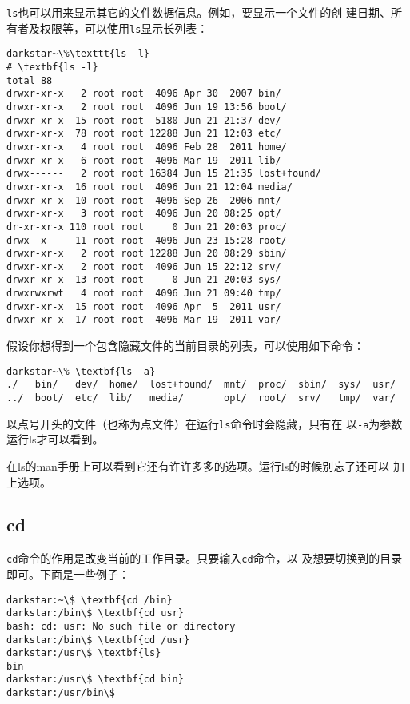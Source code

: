 \texttt{ls}也可以用来显示其它的文件数据信息。例如，要显示一个文件的创
建日期、所有者及权限等，可以使用\texttt{ls}显示长列表：
\begin{Verbatim}[frame=single,commandchars=\\\{\}]
darkstar~\%\texttt{ls -l}
# \textbf{ls -l}
total 88
drwxr-xr-x   2 root root  4096 Apr 30  2007 bin/
drwxr-xr-x   2 root root  4096 Jun 19 13:56 boot/
drwxr-xr-x  15 root root  5180 Jun 21 21:37 dev/
drwxr-xr-x  78 root root 12288 Jun 21 12:03 etc/
drwxr-xr-x   4 root root  4096 Feb 28  2011 home/
drwxr-xr-x   6 root root  4096 Mar 19  2011 lib/
drwx------   2 root root 16384 Jun 15 21:35 lost+found/
drwxr-xr-x  16 root root  4096 Jun 21 12:04 media/
drwxr-xr-x  10 root root  4096 Sep 26  2006 mnt/
drwxr-xr-x   3 root root  4096 Jun 20 08:25 opt/
dr-xr-xr-x 110 root root     0 Jun 21 20:03 proc/
drwx--x---  11 root root  4096 Jun 23 15:28 root/
drwxr-xr-x   2 root root 12288 Jun 20 08:29 sbin/
drwxr-xr-x   2 root root  4096 Jun 15 22:12 srv/
drwxr-xr-x  13 root root     0 Jun 21 20:03 sys/
drwxrwxrwt   4 root root  4096 Jun 21 09:40 tmp/
drwxr-xr-x  15 root root  4096 Apr  5  2011 usr/
drwxr-xr-x  17 root root  4096 Mar 19  2011 var/
\end{Verbatim}

假设你想得到一个包含隐藏文件的当前目录的列表，可以使用如下命令：
\begin{Verbatim}[frame=single,commandchars=\\\{\}]
darkstar~\% \textbf{ls -a}
./   bin/   dev/  home/  lost+found/  mnt/  proc/  sbin/  sys/  usr/
../  boot/  etc/  lib/   media/       opt/  root/  srv/   tmp/  var/
\end{Verbatim}
以点号开头的文件（也称为点文件）在运行\texttt{ls}命令时会隐藏，只有在
以\texttt{-a}为参数运行ls才可以看到。

在ls的man手册上可以看到它还有许许多多的选项。运行ls的时候别忘了还可以
加上选项。


\subsection{cd}
\label{sec:handlingFilesAndDirectories:navigation:cd}

\texttt{cd}命令的作用是改变当前的工作目录。只要输入\texttt{cd}命令，以
及想要切换到的目录即可。下面是一些例子：
\begin{Verbatim}[frame=single,commandchars=\\\{\}]
darkstar:~\$ \textbf{cd /bin}
darkstar:/bin\$ \textbf{cd usr}
bash: cd: usr: No such file or directory
darkstar:/bin\$ \textbf{cd /usr}
darkstar:/usr\$ \textbf{ls}
bin
darkstar:/usr\$ \textbf{cd bin}
darkstar:/usr/bin\$
\end{Verbatim}


